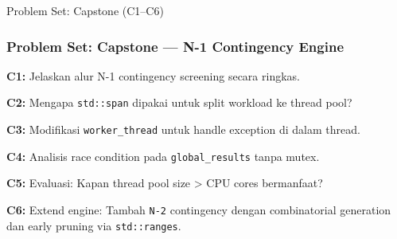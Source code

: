 \documentclass[aspectratio=169,10pt]{beamer}
\begin{document}
\begin{frame}[allowframebreaks]{Problem Set: Capstone (C1--C6)}
  \frametitle{Problem Set: Capstone — N-1 Contingency Engine}
  
  \textbf{C1:} Jelaskan alur N-1 contingency screening secara ringkas.
  
  \textbf{C2:} Mengapa \texttt{std::span} dipakai untuk split workload ke thread pool?
  
  \textbf{C3:} Modifikasi \texttt{worker\_thread} untuk handle exception di dalam thread.
  
  \textbf{C4:} Analisis race condition pada \texttt{global\_results} tanpa mutex.
  
  \textbf{C5:} Evaluasi: Kapan thread pool size > CPU cores bermanfaat?
  
  \textbf{C6:} Extend engine: Tambah \texttt{N-2} contingency dengan combinatorial generation
  dan early pruning via \texttt{std::ranges}.
\end{frame}
\end{document}
